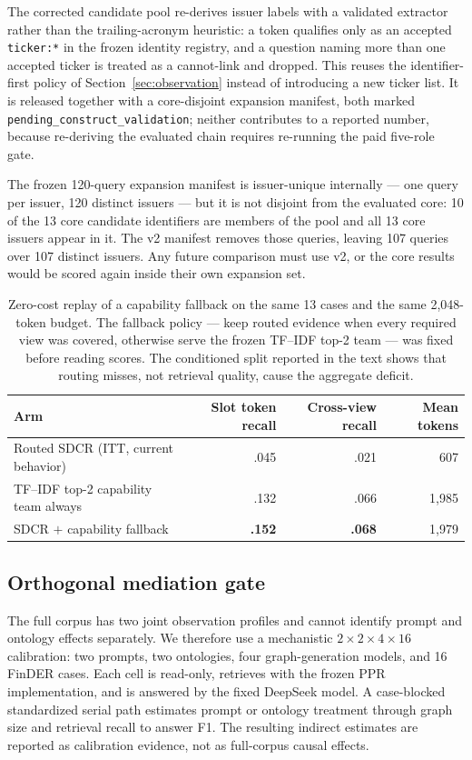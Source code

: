 The corrected candidate pool re-derives issuer labels with a validated extractor rather than the trailing-acronym heuristic: a token qualifies only as an accepted \texttt{ticker:*} in the frozen identity registry, and a question naming more than one accepted ticker is treated as a cannot-link and dropped. This reuses the identifier-first policy of Section~\ref{sec:observation} instead of introducing a new ticker list. It is released together with a core-disjoint expansion manifest, both marked \texttt{pending\_construct\_validation}; neither contributes to a reported number, because re-deriving the evaluated chain requires re-running the paid five-role gate.

The frozen 120-query expansion manifest is issuer-unique internally --- one query per issuer, 120 distinct issuers --- but it is not disjoint from the evaluated core: 10 of the 13 core candidate identifiers are members of the pool and all 13 core issuers appear in it. The v2 manifest removes those queries, leaving 107 queries over 107 distinct issuers. Any future comparison must use v2, or the core results would be scored again inside their own expansion set.

\begin{table}[t]
\centering
\caption{Zero-cost replay of a capability fallback on the same 13 cases and the same 2,048-token budget. The fallback policy --- keep routed evidence when every required view was covered, otherwise serve the frozen TF--IDF top-2 team --- was fixed before reading scores. The conditioned split reported in the text shows that routing misses, not retrieval quality, cause the aggregate deficit.}
\label{tab:fallback}
\small
\begin{tabular}{lrrr}
\toprule
Arm & Slot token recall & Cross-view recall & Mean tokens\\
\midrule
Routed SDCR (ITT, current behavior) & .045 & .021 & 607\\
TF--IDF top-2 capability team always & .132 & .066 & 1{,}985\\
SDCR $+$ capability fallback & \textbf{.152} & \textbf{.068} & 1{,}979\\
\bottomrule
\end{tabular}
\end{table}

\subsection{Orthogonal mediation gate}
\label{app:mediation}
The full corpus has two joint observation profiles and cannot identify prompt and ontology effects separately. We therefore use a mechanistic $2\times2\times4\times16$ calibration: two prompts, two ontologies, four graph-generation models, and 16 FinDER cases. Each cell is read-only, retrieves with the frozen PPR implementation, and is answered by the fixed DeepSeek model. A case-blocked standardized serial path estimates prompt or ontology treatment through graph size and retrieval recall to answer F1. The resulting indirect estimates are reported as calibration evidence, not as full-corpus causal effects.




